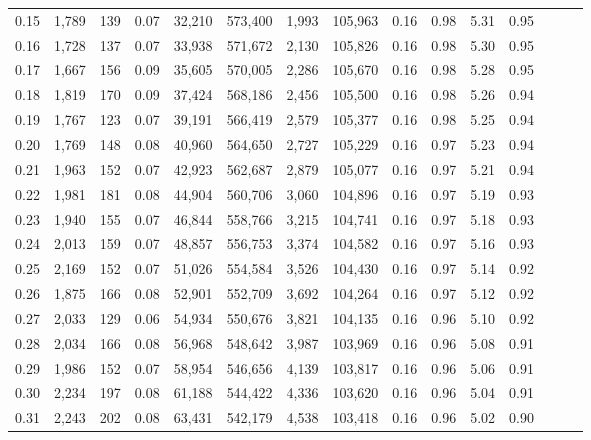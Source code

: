 \begin{tabular}{rrrrrrrrrrrrrrr}
0.15 &   1,789 &    139 &  0.07 &   32,210 &  573,400 &    1,993 &  105,963 &  0.16 &  0.98 &  5.31 &      0.95 \\
0.16 &   1,728 &    137 &  0.07 &   33,938 &  571,672 &    2,130 &  105,826 &  0.16 &  0.98 &  5.30 &      0.95 \\
0.17 &   1,667 &    156 &  0.09 &   35,605 &  570,005 &    2,286 &  105,670 &  0.16 &  0.98 &  5.28 &      0.95 \\
0.18 &   1,819 &    170 &  0.09 &   37,424 &  568,186 &    2,456 &  105,500 &  0.16 &  0.98 &  5.26 &      0.94 \\
0.19 &   1,767 &    123 &  0.07 &   39,191 &  566,419 &    2,579 &  105,377 &  0.16 &  0.98 &  5.25 &      0.94 \\
0.20 &   1,769 &    148 &  0.08 &   40,960 &  564,650 &    2,727 &  105,229 &  0.16 &  0.97 &  5.23 &      0.94 \\
0.21 &   1,963 &    152 &  0.07 &   42,923 &  562,687 &    2,879 &  105,077 &  0.16 &  0.97 &  5.21 &      0.94 \\
0.22 &   1,981 &    181 &  0.08 &   44,904 &  560,706 &    3,060 &  104,896 &  0.16 &  0.97 &  5.19 &      0.93 \\
0.23 &   1,940 &    155 &  0.07 &   46,844 &  558,766 &    3,215 &  104,741 &  0.16 &  0.97 &  5.18 &      0.93 \\
0.24 &   2,013 &    159 &  0.07 &   48,857 &  556,753 &    3,374 &  104,582 &  0.16 &  0.97 &  5.16 &      0.93 \\
0.25 &   2,169 &    152 &  0.07 &   51,026 &  554,584 &    3,526 &  104,430 &  0.16 &  0.97 &  5.14 &      0.92 \\
0.26 &   1,875 &    166 &  0.08 &   52,901 &  552,709 &    3,692 &  104,264 &  0.16 &  0.97 &  5.12 &      0.92 \\
0.27 &   2,033 &    129 &  0.06 &   54,934 &  550,676 &    3,821 &  104,135 &  0.16 &  0.96 &  5.10 &      0.92 \\
0.28 &   2,034 &    166 &  0.08 &   56,968 &  548,642 &    3,987 &  103,969 &  0.16 &  0.96 &  5.08 &      0.91 \\
0.29 &   1,986 &    152 &  0.07 &   58,954 &  546,656 &    4,139 &  103,817 &  0.16 &  0.96 &  5.06 &      0.91 \\
0.30 &   2,234 &    197 &  0.08 &   61,188 &  544,422 &    4,336 &  103,620 &  0.16 &  0.96 &  5.04 &      0.91 \\
0.31 &   2,243 &    202 &  0.08 &   63,431 &  542,179 &    4,538 &  103,418 &  0.16 &  0.96 &  5.02 &      0.90 \\

\end{tabular}
